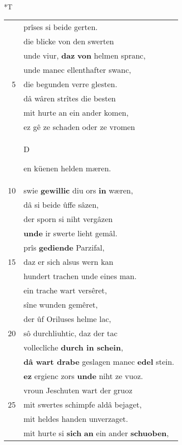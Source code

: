 \documentclass[8pt,a4paper,notitlepage]{article}
\begin{document}
\begin{table}[ht]
\begin{minipage}[t]{0.5\linewidth}
\end{minipage}
\hspace{0.5cm}
\begin{minipage}[t]{0.5\linewidth}
\small
\begin{center}*T
\end{center}
\begin{tabular}{rl}
 & prîses si beide gerten.\\ 
 & die blicke von den swerten\\ 
 & unde viur, \textbf{daz} \textbf{von} helmen spranc,\\ 
 & unde manec ellenthafter swanc,\\ 
5 & die begunden verre glesten.\\ 
 & dâ wâren strîtes die besten\\ 
 & mit hurte an ein ander komen,\\ 
 & ez gê ze schaden oder ze vromen\\ 
 & \begin{large}D\end{large}en küenen helden mæren.\\ 
10 & swie \textbf{gewillic} diu ors \textbf{in} wæren,\\ 
 & dâ si beide ûffe sâzen,\\ 
 & der sporn si niht vergâzen\\ 
 & \textbf{unde} ir swerte lieht gemâl.\\ 
 & prîs \textbf{gediende} Parzifal,\\ 
15 & daz er sich alsus wern kan\\ 
 & hundert trachen unde eines man.\\ 
 & ein trache wart versêret,\\ 
 & sîne wunden gemêret,\\ 
 & der ûf Oriluses helme lac,\\ 
20 & sô durchliuhtic, daz der tac\\ 
 & volleclîche \textbf{durch in schein},\\ 
 & \textbf{dâ wart drabe} geslagen manec \textbf{edel} stein.\\ 
 & \textbf{ez} ergienc zors \textbf{unde} niht ze vuoz.\\ 
 & vroun Jeschuten wart der gruoz\\ 
25 & mit swertes schimpfe aldâ bejaget,\\ 
 & mit heldes handen unverzaget.\\ 
 & mit hurte si \textbf{sich} \textbf{an} ein ander \textbf{schuoben},\\ 

\end{tabular}
\end{minipage}
\end{table}
\end{document}
